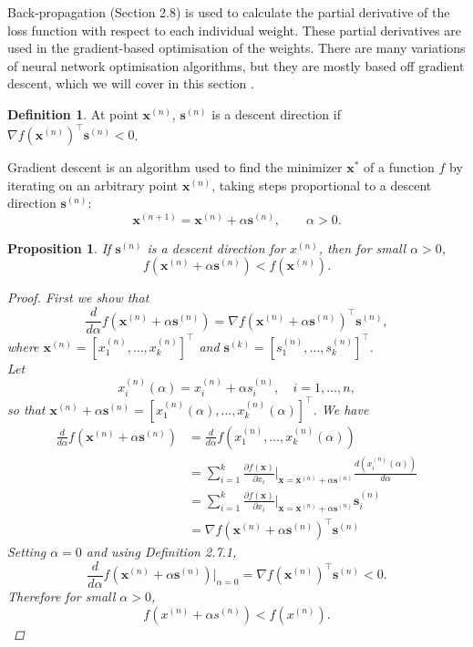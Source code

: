 \documentclass[honours,12pt]{unswthesis}
\newtheorem{proposition}[theorem]{Proposition}
\numberwithin{equation}{section}
\theoremstyle{definition}
\newtheorem{definition}[theorem]{Definition}
\begin{document}
Back-propagation (Section 2.8) is used to calculate the partial derivative of the loss function with respect to each individual weight. These partial derivatives are used in the gradient-based optimisation of the weights. There are many variations of neural network optimisation algorithms, but they are mostly based off gradient descent, which we will cover in this section \citep{optimneural}.
\begin{definition}
At point $\bm{x}^{(n)}$, $\bm{s}^{(n)}$ is a descent direction if $\nabla f\left(\bm{x}^{(n)}\right)^\top \bm{s}^{(n)}<0$.
\end{definition}
Gradient descent \citep{optim} is an algorithm used to find the minimizer $\bm{x}^*$ of a function $f$ by iterating on an arbitrary point $\bm{x}^{(n)}$, taking steps proportional to a descent direction $\bm{s}^{(n)}$:
\[\bm{x}^{(n+1)}=\bm{x}^{(n)}+\alpha \bm{s}^{(n)},\qquad \alpha>0.\]
\begin{proposition} If $\bm{s}^{(n)}$ is a descent direction for $x^{(n)}$, then for small $\alpha>0$,
\[f(\bm{x}^{(n)}+\alpha \bm{s}^{(n)})<f(\bm{x}^{(n)}).\]
\begin{proof}
First we show that
\[\frac{d}{d\alpha}f(\bm{x}^{(n)}+\alpha \bm{s}^{(n)})=\nabla f(\bm{x}^{(n)}+\alpha \bm{s}^{(n)})^\top \bm{s}^{(n)},\]
where $\bm{x}^{(n)}=[x_1^{(n)},\dots,x_k^{(n)}]^\top$ and $\bm{s}^{(k)}=[s_1^{(n)},\dots,s_k^{(n)}]^\top$.\\
Let
\[x_i^{(n)}(\alpha)=x_i^{(n)}+\alpha s_i^{(n)},\quad i=1,\dots,n,\]
so that $\bm{x}^{(n)}+\alpha \bm{s}^{(n)}=[x_1^{(n)}(\alpha),\dots,x_k^{(n)}(\alpha)]^\top$.
We have
\begin{align*}
\frac{d}{d\alpha}f(\bm{x}^{(n)}+\alpha\bm{s}^{(n)})&= \frac{d}{d\alpha}f(x_1^{(n)},\dots,x_k^{(n)}(\alpha))\\
&= \sum^k_{i=1}\frac{\partial f(\bm{x})}{\partial x_i}|_{\bm{x}=\bm{x}^{(n)}+\alpha \bm{s}^{(n)}}\frac{d(x_i^{(n)}(\alpha))}{d\alpha}\\
&=\sum_{i=1}^k\frac{\partial f(\bm{x})}{\partial x_i}|_{\bm{x}=\bm{x}^{(n)}+\alpha \bm{s}^{(n)}}\bm{s}_i^{(n)}\\
&=\nabla f(\bm{x}^{(n)}+\alpha \bm{s}^{(n)})^\top \bm{s}^{(n)}
\end{align*}
Setting $\alpha=0$ and using Definition 2.7.1,
\[\frac{d}{d\alpha}f(\bm{x}^{(n)}+\alpha\bm{s}^{(n)})|_{\alpha=0}=\nabla f(\bm{x}^{(n)})^\top \bm{s}^{(n)}<0.\]
Therefore for small $\alpha>0$,
\[f(x^{(n)}+\alpha s^{(n)})<f(x^{(n)}).\]
\end{proof}
\end{proposition}
\end{document}
